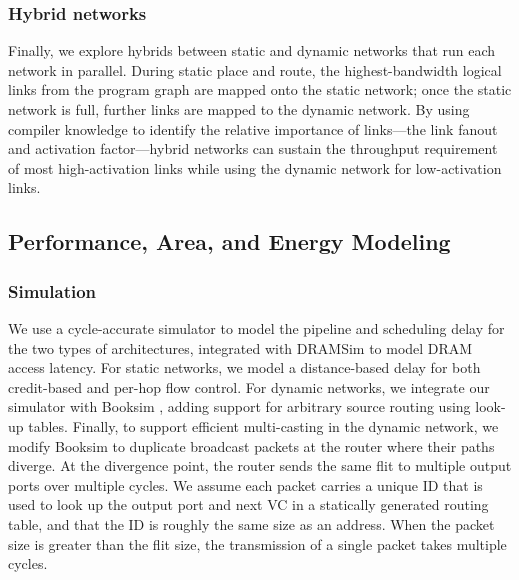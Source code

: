 \subsubsection{Hybrid networks}
Finally, we explore hybrids between static and dynamic networks that run each network in parallel. 
During static place and route, the highest-bandwidth logical links from the program graph are mapped onto the static network; once the static network is full, further links are mapped to the dynamic network.
By using compiler knowledge to identify the relative importance of links---the link fanout and activation factor---hybrid networks can sustain the throughput requirement of most high-activation links while using the dynamic network for low-activation links.

\subsection{Performance, Area, and Energy Modeling} \label{sec:net_char}

\subsubsection{Simulation}
We use a cycle-accurate simulator to model the pipeline and scheduling delay for the two types of architectures,
 integrated with DRAMSim \cite{dramsim} to model DRAM access latency. For static networks, we model
a distance-based delay for both credit-based and per-hop flow control. 
For dynamic networks, we integrate
our simulator with Booksim \cite{jiang2013detailed}, adding support for arbitrary source routing using look-up tables. 
Finally, to support efficient multi-casting in the dynamic network, we modify Booksim to duplicate broadcast packets at the router where their paths diverge.
At the divergence point, the router sends the same flit to multiple output ports over multiple cycles.
We assume each packet carries a unique ID that is used to look up the output port and next VC in a statically generated routing table, and that the ID is roughly the same size as an address.
When the packet size is greater than the flit size, the transmission of a single packet takes multiple cycles.

